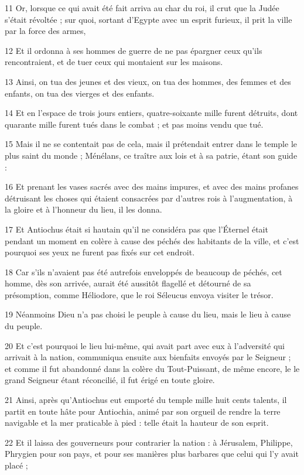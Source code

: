 \par 11 Or, lorsque ce qui avait été fait arriva au char du roi, il crut que la Judée s'était révoltée ; sur quoi, sortant d'Egypte avec un esprit furieux, il prit la ville par la force des armes,
\par 12 Et il ordonna à ses hommes de guerre de ne pas épargner ceux qu'ils rencontraient, et de tuer ceux qui montaient sur les maisons.
\par 13 Ainsi, on tua des jeunes et des vieux, on tua des hommes, des femmes et des enfants, on tua des vierges et des enfants.
\par 14 Et en l'espace de trois jours entiers, quatre-soixante mille furent détruits, dont quarante mille furent tués dans le combat ; et pas moins vendu que tué.
\par 15 Mais il ne se contentait pas de cela, mais il prétendait entrer dans le temple le plus saint du monde ; Ménélans, ce traître aux lois et à sa patrie, étant son guide :
\par 16 Et prenant les vases sacrés avec des mains impures, et avec des mains profanes détruisant les choses qui étaient consacrées par d'autres rois à l'augmentation, à la gloire et à l'honneur du lieu, il les donna.
\par 17 Et Antiochus était si hautain qu'il ne considéra pas que l'Éternel était pendant un moment en colère à cause des péchés des habitants de la ville, et c'est pourquoi ses yeux ne furent pas fixés sur cet endroit.
\par 18 Car s'ils n'avaient pas été autrefois enveloppés de beaucoup de péchés, cet homme, dès son arrivée, aurait été aussitôt flagellé et détourné de sa présomption, comme Héliodore, que le roi Séleucus envoya visiter le trésor.
\par 19 Néanmoins Dieu n'a pas choisi le peuple à cause du lieu, mais le lieu à cause du peuple.
\par 20 Et c'est pourquoi le lieu lui-même, qui avait part avec eux à l'adversité qui arrivait à la nation, communiqua ensuite aux bienfaits envoyés par le Seigneur ; et comme il fut abandonné dans la colère du Tout-Puissant, de même encore, le le grand Seigneur étant réconcilié, il fut érigé en toute gloire.
\par 21 Ainsi, après qu'Antiochus eut emporté du temple mille huit cents talents, il partit en toute hâte pour Antiochia, animé par son orgueil de rendre la terre navigable et la mer praticable à pied : telle était la hauteur de son esprit.
\par 22 Et il laissa des gouverneurs pour contrarier la nation : à Jérusalem, Philippe, Phrygien pour son pays, et pour ses manières plus barbares que celui qui l'y avait placé ;
